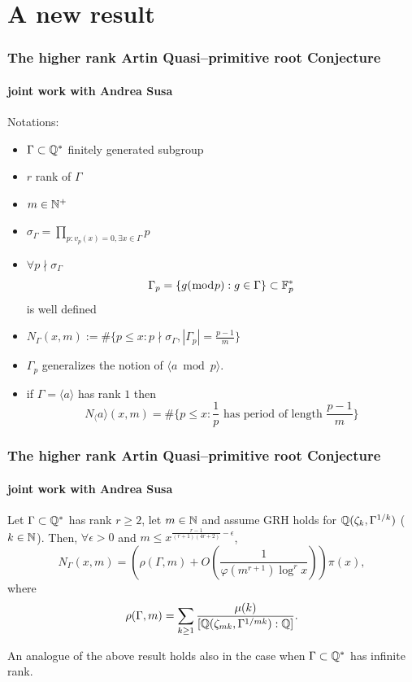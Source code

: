 \documentclass[10pt,handout]{beamer} %
\begin{document}
\section{A new result}
 \begin{frame}
 \frametitle{The higher rank Artin Quasi--primitive root Conjecture}
\framesubtitle{joint work with Andrea Susa}

Notations:\pause

\begin{itemize}[<+-|alert@+>]
\item  $\Gamma\subset\mathbb Q^*$ finitely  generated  subgroup
\item $r$ rank of $\Gamma$
\item   $m \in \mathbb N^+$
\item  $\sigma_\Gamma=\prod_{p: v_p(x)=0,\exists x \in \Gamma}p$
\item   $\forall p\nmid\sigma_\Gamma$
$$\Gamma_p =\{g(\bmod{p}): g\in\Gamma\}\subset\mathbb F_p^*$$ 
is well defined
\item
$N_\Gamma(x,m) := \#\{p\leq x: p\nmid\sigma_\Gamma, |\Gamma_p| =\frac{p-1}m\}$
\item $\Gamma_p$ generalizes the notion of $\langle a\bmod p\rangle$.
\item if $\Gamma=\langle a\rangle$ has rank $1$ then\\
$$N_\langle a\rangle(x,m) =\#\{p\leq x: \frac1p\text{ has period of length } \frac{p-1}m\}$$
\end{itemize}
\end{frame}

 \begin{frame}
 \frametitle{The higher rank Artin Quasi--primitive root Conjecture}
\framesubtitle{joint work with Andrea Susa}

\begin{Theorem} Let $\Gamma \subset \mathbb Q^*$ has rank $r\ge2$,  let $m\in\mathbb N$ and  
assume GRH holds for $\mathbb Q(\zeta_{k},\Gamma^{1/k})$ ($k\in\mathbb N$). 
Then, $\forall\epsilon>0$ and 
$m\le x^{\frac{r-1}{(r+1)(4r+2)}-\epsilon}$,\pause
$$N_{\Gamma}(x,m)=\left(\rho(\Gamma,m)+O\!\left(\frac{1}{\varphi(m^{r+1})\log^rx} %
\right)\right) \pi(x),$$
where\pause
$$\rho(\Gamma,m)= \sum_{ k \geq 1}
\frac{\mu(k)}{[\mathbb Q(\zeta_{mk},\Gamma^{1/mk}):\mathbb Q]}.
$$
\end{Theorem}\pause

An analogue of the above result holds also in the case when $\Gamma\subset\mathbb Q^*$ has 
infinite rank.
\end{frame}
 
\end{document}
